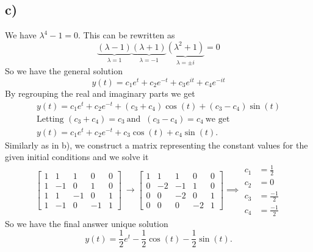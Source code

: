 \documentclass[
	12pt,
	]{article}
\theoremstyle{definition}
\theoremstyle{definition}
\theoremstyle{definition}
\theoremstyle{definition}
\theoremstyle{definition}
\theoremstyle{example}
\theoremstyle{note}
\theoremstyle{remark}
\theoremstyle{example}
\begin{document}
		\subsection*{c) }
			We have $\lambda^{4} -1 =0$. This can be rewritten as
			$$ \underbrace{(\lambda -1 )}_{\lambda = 1} \underbrace{(\lambda + 1)}_{\lambda = -1}\underbrace{(\lambda^{2} +1)}_{\lambda  = \pm i}=0$$
			So we have the general solution 
			$$ y(t) = c_{1}e^{t} + c_{2}e^{-t} + c_{3}e^{it} + c_{4}e^{-it}$$
			By regrouping the real and imaginary parts we get 
			\begin{gather*}
				y(t) = c_{1}e^{t} + c_{2}e^{-t} + (c_{3}+c_{4})\cos(t) +(c_{3}-c_{4})\sin(t) \\
				\text{Letting } (c_{3} +c_{4}) = c_{3} \ \text{and } \ (c_{3} - c_{4}) = c_{4} \ \text{we get }\\
				y(t) = c_{1} e^{t} + c_{2}e^{-t} + c_{3}\cos(t) + c_{4}\sin(t).
			\end{gather*}
			Similarly as in b), we construct a matrix representing the constant values for the given initial conditions and we solve it 
			\begin{equation*}
			\begin{bmatrix}
				1 & 1& 1& 0 & 0 \\
					1 & -1 & 0 & 1 & 0 \\
								1 & 1 & -1 & 0 & 1 \\
								1 & -1 & 0 & -1 &1 
							\end{bmatrix}
							 \ \xrightarrow{} 
							\begin{bmatrix}
								1 & 1& 1& 0 & 0 \\
								0 & -2 & -1 & 1 & 0 \\
								0 & 0 & -2 & 0 & 1 \\
								0 & 0 & 0 & -2 & 1 
							\end{bmatrix}
							\implies 
							\begin{align*}
								c_{1} &= \frac{1}{2} \\
								c_{2} &= 0\\
								c_{3} &= \frac{-1}{2} \\
								c_{4} &= \frac{-1}{2} 
							\end{align*}
						\end{equation*}
			So we have the final answer unique solution 
			$$ y(t) = \frac{1}{2}e^{t} - \frac{1}{2}\cos(t) - \frac12 \sin(t).$$
\end{document}
